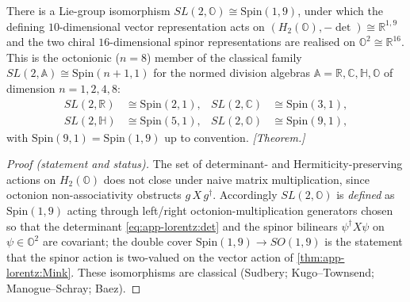 \begin{theorem}[Octonionic exceptional isomorphism; \texorpdfstring{$SL(2,\mathbb{O})\cong\mathrm{Spin}(1,9)$}{SL(2,O)=Spin(1,9)}]
\label{thm:app-lorentz:SL2O}
There is a Lie-group isomorphism $SL(2,\mathbb{O})\cong\mathrm{Spin}(1,9)$, under
which the defining $10$-dimensional vector representation acts on
$(H_{2}(\mathbb{O}),-\det)\cong\mathbb{R}^{1,9}$ and the two chiral
$16$-dimensional spinor representations are realised on
$\mathbb{O}^{2}\cong\mathbb{R}^{16}$. This is the octonionic ($n=8$) member of the
classical family $SL(2,\mathbb{A})\cong\mathrm{Spin}(n+1,1)$ for the normed
division algebras $\mathbb{A}=\mathbb{R},\mathbb{C},\mathbb{H},\mathbb{O}$ of
dimension $n=1,2,4,8$:
\begin{equation}
\label{eq:app-lorentz:family}
\begin{aligned}
SL(2,\mathbb{R}) &\cong \mathrm{Spin}(2,1), &
SL(2,\mathbb{C}) &\cong \mathrm{Spin}(3,1), \\
SL(2,\mathbb{H}) &\cong \mathrm{Spin}(5,1), &
SL(2,\mathbb{O}) &\cong \mathrm{Spin}(9,1),
\end{aligned}
\end{equation}
with $\mathrm{Spin}(9,1)=\mathrm{Spin}(1,9)$ up to convention. \emph{[Theorem.]}
\end{theorem}

\begin{proof}[Proof (statement and status)]
The set of determinant- and Hermiticity-preserving actions on
$H_{2}(\mathbb{O})$ does not close under naive matrix multiplication, since
octonion non-associativity obstructs $g\,X\,g^{\dagger}$. Accordingly
$SL(2,\mathbb{O})$ is \emph{defined} as $\mathrm{Spin}(1,9)$ acting through
left/right octonion-multiplication generators chosen so that the determinant
\eqref{eq:app-lorentz:det} and the spinor bilinears $\psi^{\dagger}X\psi$ on
$\psi\in\mathbb{O}^{2}$ are covariant; the double cover
$\mathrm{Spin}(1,9)\to SO(1,9)$ is the statement that the spinor action is
two-valued on the vector action of \autoref{thm:app-lorentz:Mink}. These
isomorphisms are classical (Sudbery; Kugo--Townsend; Manogue--Schray; Baez).
\end{proof}


